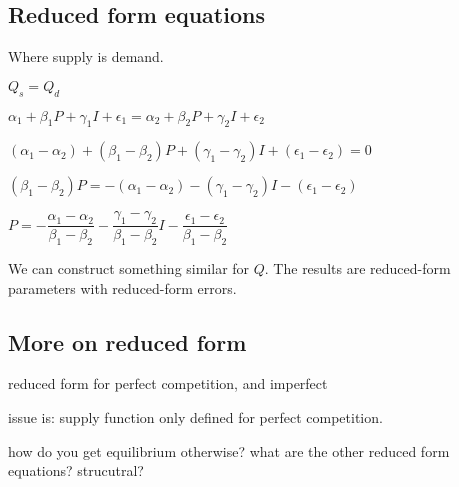 

\subsection{Reduced form equations}

Where supply is demand.

\(Q_s=Q_d\)

\(\alpha_1 + \beta_1P+\gamma_1I + \epsilon_1=\alpha_2 + \beta_2P+\gamma_2I + \epsilon_2\)

\((\alpha_1 -\alpha_2) + (\beta_1- \beta_2)P+(\gamma_1-\gamma_2) I + (\epsilon_1-\epsilon_2)=0\)


\((\beta_1- \beta_2)P=-(\alpha_1 -\alpha_2) - (\gamma_1-\gamma_2) I - (\epsilon_1-\epsilon_2)\)

\(P=-\dfrac{\alpha_1 -\alpha_2}{\beta_1- \beta_2} - \dfrac{\gamma_1-\gamma_2}{\beta_1- \beta_2} I - \dfrac{\epsilon_1-\epsilon_2}{\beta_1- \beta_2}\)

We can construct something similar for \(Q\). The results are reduced-form parameters with reduced-form errors.


\subsection{More on reduced form}

reduced form for perfect competition, and imperfect

issue is: supply function only defined for perfect competition.

how do you get equilibrium otherwise? what are the other reduced form equations? strucutral?

